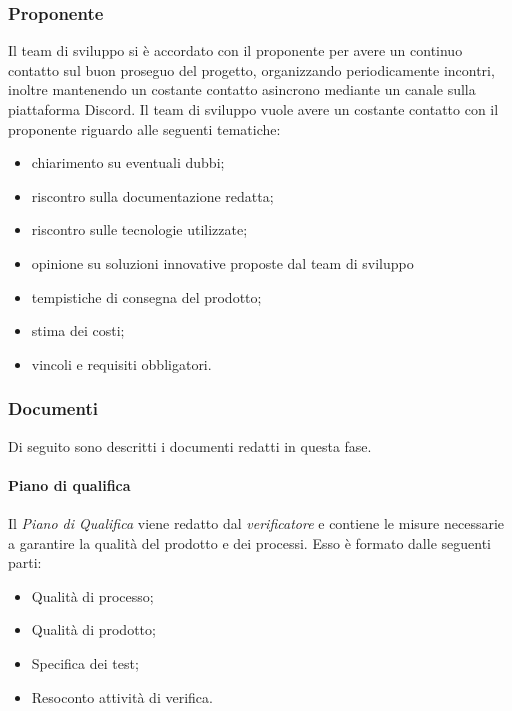 \subsubsection{Proponente}\label{subsubsection: proponente_fornitura}
Il team di sviluppo si è accordato con il proponente per avere un continuo contatto sul buon proseguo del progetto, organizzando periodicamente incontri, inoltre mantenendo un costante contatto asincrono mediante un canale sulla piattaforma Discord.
Il team di sviluppo vuole avere un costante contatto con il proponente riguardo alle seguenti tematiche:
\begin {itemize}
    \item chiarimento su eventuali dubbi;
    \item riscontro sulla documentazione redatta;
    \item riscontro sulle tecnologie utilizzate;
    \item opinione su soluzioni innovative proposte dal team di sviluppo
    \item tempistiche di consegna del prodotto;
    \item stima dei costi;
    \item vincoli e requisiti obbligatori.
\end{itemize}
\subsubsection {Documenti}\label{subsubsection: documenti_fornitura}
Di seguito sono descritti i documenti redatti in questa fase.
\paragraph{Piano di qualifica}\label{paragraph: PdQ_fornitura}
Il \textit{Piano di Qualifica} viene redatto dal \textit{verificatore} e contiene le misure necessarie a garantire la qualità del prodotto e dei processi.
Esso è formato dalle seguenti parti:
\begin{itemize}
    \item Qualità di processo;
    \item Qualità di prodotto;
    \item Specifica dei test;
    \item Resoconto attività di verifica.
\end{itemize}
